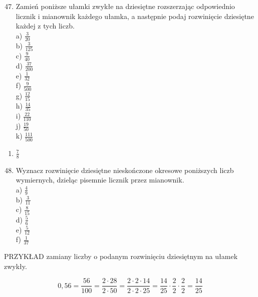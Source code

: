 \documentclass[10pt]{article}
\begin{document}
\begin{enumerate}
  \setcounter{enumi}{46}
  \item Zamień poniższe ułamki zwykłe na dziesiętne rozszerzając odpowiednio licznik i mianownik każdego ułamka, a następnie podaj rozwinięcie dziesiętne każdej z tych liczb.\\
a) \(\frac{3}{20}\)\\
b) \(\frac{3}{125}\)\\
c) \(\frac{9}{40}\)\\
d) \(\frac{37}{200}\)\\
e) \(\frac{1}{32}\)\\
f) \(\frac{9}{500}\)\\
g) \(\frac{12}{15}\)\\
h) \(\frac{14}{35}\)\\
i) \(\frac{22}{110}\)\\
j) \(\frac{19}{50}\)\\
k) \(\frac{111}{500}\)
\end{enumerate}

\begin{enumerate}
  \item \(\frac{7}{8}\)
\end{enumerate}

\begin{enumerate}
  \setcounter{enumi}{47}
  \item Wyznacz rozwinięcie dziesiętne nieskończone okresowe poniższych liczb wymiernych, dzieląc pisemnie licznik przez mianownik.\\
a) \(\frac{4}{9}\)\\
b) \(\frac{3}{11}\)\\
c) \(\frac{8}{15}\)\\
d) \(\frac{5}{6}\)\\
e) \(\frac{5}{12}\)\\
f) \(\frac{1}{37}\)
\end{enumerate}

PRZYKŁAD zamiany liczby o podanym rozwinięciu dziesiętnym na ułamek zwykły.

\[
0,56=\frac{56}{100}=\frac{2 \cdot 28}{2 \cdot 50}=\frac{2 \cdot 2 \cdot 14}{2 \cdot 2 \cdot 25}=\frac{14}{25} \cdot \frac{2}{2} \cdot \frac{2}{2}=\frac{14}{25}
\]
\end{document}

